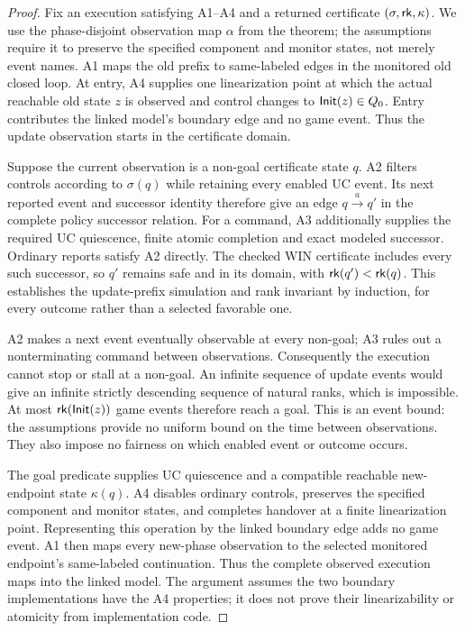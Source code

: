 \begin{proof}
Fix an execution satisfying A1--A4 and a returned certificate $(\sigma,\mathsf{rk},\kappa)$. We use the phase-disjoint observation map $\alpha$ from the theorem; the assumptions require it to preserve the specified component and monitor states, not merely event names. A1 maps the old prefix to same-labeled edges in the monitored old closed loop. At entry, A4 supplies one linearization point at which the actual reachable old state $z$ is observed and control changes to $\mathsf{Init}(z)\in Q_0$. Entry contributes the linked model's boundary edge and no game event. Thus the update observation starts in the certificate domain.

Suppose the current observation is a non-goal certificate state $q$. A2 filters controls according to $\sigma(q)$ while retaining every enabled UC event. Its next reported event and successor identity therefore give an edge $q\xrightarrow{a}q'$ in the complete policy successor relation. For a command, A3 additionally supplies the required UC quiescence, finite atomic completion and exact modeled successor. Ordinary reports satisfy A2 directly. The checked WIN certificate includes every such successor, so $q'$ remains safe and in its domain, with $\mathsf{rk}(q')<\mathsf{rk}(q)$. This establishes the update-prefix simulation and rank invariant by induction, for every outcome rather than a selected favorable one.

A2 makes a next event eventually observable at every non-goal; A3 rules out a nonterminating command between observations. Consequently the execution cannot stop or stall at a non-goal. An infinite sequence of update events would give an infinite strictly descending sequence of natural ranks, which is impossible. At most $\mathsf{rk}(\mathsf{Init}(z))$ game events therefore reach a goal. This is an event bound: the assumptions provide no uniform bound on the time between observations. They also impose no fairness on which enabled event or outcome occurs.

The goal predicate supplies UC quiescence and a compatible reachable new-endpoint state $\kappa(q)$. A4 disables ordinary controls, preserves the specified component and monitor states, and completes handover at a finite linearization point. Representing this operation by the linked boundary edge adds no game event. A1 then maps every new-phase observation to the selected monitored endpoint's same-labeled continuation. Thus the complete observed execution maps into the linked model. The argument assumes the two boundary implementations have the A4 properties; it does not prove their linearizability or atomicity from implementation code.


\end{proof}
